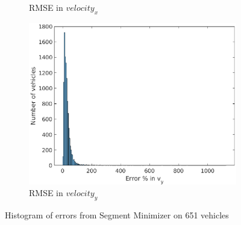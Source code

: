 \begin{figure}[h!]
\begin{subfigure}{.5\textwidth}
\caption{RMSE in $velocity_x$}
\end{subfigure}
\begin{subfigure}{.5\textwidth}
\centering
\includegraphics[width=.8\linewidth]{figures/s_cavYerror}
\caption{RMSE in $velocity_y$}
\end{subfigure}
\caption{Histogram of errors from Segment Minimizer on 651 vehicles }
\label{fig:histogram}
\end{figure}
